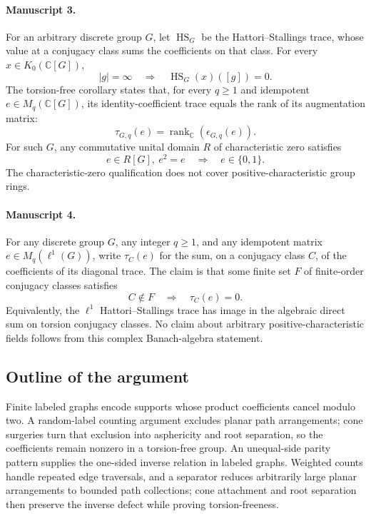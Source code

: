 \documentclass[11pt]{article}
\begin{document}
\paragraph{Manuscript 3.}
For an arbitrary discrete group \(G\), let \(\operatorname{HS}_G\) be the Hattori--Stallings trace, whose value at a conjugacy class sums the coefficients on that class. For every \(x\in K_0(\mathbb C[G])\),
\[
 |g|=\infty\quad\Longrightarrow\quad\operatorname{HS}_G(x)([g])=0.
\]
The torsion-free corollary states that, for every \(q\ge1\) and idempotent \(e\in M_q(\mathbb C[G])\), its identity-coefficient trace equals the rank of its augmentation matrix:
\[
 \tau_{G,q}(e)=\operatorname{rank}_{\mathbb C}(\epsilon_{G,q}(e)).
\]
For such \(G\), any commutative unital domain \(R\) of characteristic zero satisfies
\[
 e\in R[G],\ e^2=e\quad\Longrightarrow\quad e\in\{0,1\}.
\]
The characteristic-zero qualification does not cover positive-characteristic group rings.

\paragraph{Manuscript 4.}
For any discrete group \(G\), any integer \(q\ge1\), and any idempotent matrix \(e\in M_q(\ell^1(G))\), write \(\tau_C(e)\) for the sum, on a conjugacy class \(C\), of the coefficients of its diagonal trace. The claim is that some finite set \(F\) of finite-order conjugacy classes satisfies
\[
 C\notin F\quad\Longrightarrow\quad\tau_C(e)=0.
\]
Equivalently, the \(\ell^1\) Hattori--Stallings trace has image in the algebraic direct sum on torsion conjugacy classes. No claim about arbitrary positive-characteristic fields follows from this complex Banach-algebra statement.

\subsection{Outline of the argument}
Finite labeled graphs encode supports whose product coefficients cancel modulo two. A random-label counting argument excludes planar path arrangements; cone surgeries turn that exclusion into asphericity and root separation, so the coefficients remain nonzero in a torsion-free group. An unequal-side parity pattern supplies the one-sided inverse relation in labeled graphs. Weighted counts handle repeated edge traversals, and a separator reduces arbitrarily large planar arrangements to bounded path collections; cone attachment and root separation then preserve the inverse defect while proving torsion-freeness.
\end{document}
